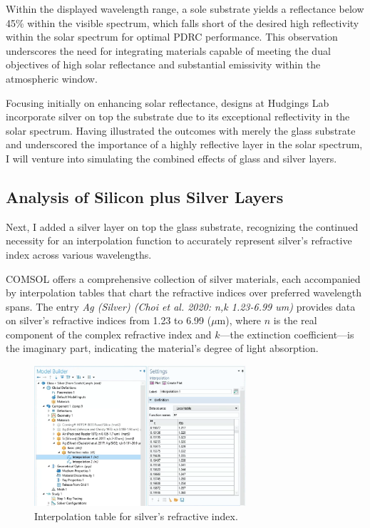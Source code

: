 Within the displayed wavelength range, a sole substrate yields a reflectance below  45\% within the visible spectrum, which falls short of the desired high reflectivity within the solar spectrum for optimal PDRC performance. This observation underscores the need for integrating materials capable of meeting the dual objectives of high solar reflectance and substantial emissivity within the atmospheric window.

Focusing initially on enhancing solar reflectance, designs at Hudgings Lab incorporate silver on top the substrate due to its exceptional reflectivity in the solar spectrum. Having illustrated the outcomes with merely the glass substrate and underscored the importance of a highly reflective layer in the solar spectrum, I will venture into simulating the combined effects of glass and silver layers.


\subsection{Analysis of Silicon plus Silver Layers}
Next, I added a silver layer on top the glass substrate, recognizing the continued necessity for an interpolation function to accurately represent silver's refractive index across various wavelengths.

COMSOL offers a comprehensive collection of silver materials, each accompanied by interpolation tables that chart the refractive indices over preferred wavelength spans. The entry \emph{Ag (Silver) (Choi et al. 2020: n,k 1.23-6.99 um)} provides data on silver’s refractive indices from 1.23 to 6.99 ($\mu$m), where $n$ is the real component of the complex refractive index and $k$—the extinction coefficient—is the imaginary part, indicating the material's degree of light absorption.

\begin{figure}[H]
  \centering
  \includegraphics[width=0.7\textwidth]{Chapters/Figures/Chapter 4 Figures/Interpolation Table for Silver.png}
  \caption{Interpolation table for silver's refractive index.}
  \label{fig:Interpolation table for silver's refractive index}
\end{figure}

